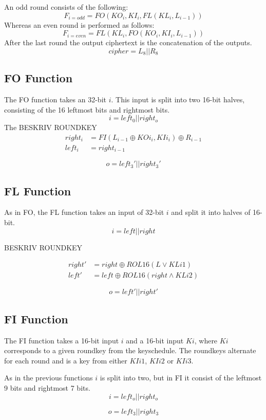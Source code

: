 An odd round consists of the following:
\[F_{i = odd} = FO(KO_i, KI_i, FL(KL_i, L_{i - 1})) \]
Whereas an even round is performed as follows: 
\[F_{i = even} = FL(KL_i, FO(KO_i,KI_i, L_{i - 1})) \]
After the last round the output ciphertext is the concatenation of the
outputs.
\[cipher = L_8 || R_8\]

\subsection{FO Function}
The FO function takes an 32-bit $i$. This input is split into two
16-bit halves, consisting of the 16 leftmost bits and rightmost bits.
\[i = left_0 || right_o\]
The 
BESKRIV ROUNDKEY
\begin{align*}
  right_i &= FI(L_{i-1} \oplus KOi_i, KIi_i) \oplus R_{i - 1}\\
  left_i &= right_{i - 1}
\end{align*}

\[o = left_3' || right_3'\]
\subsection{FL Function}
As in FO, the FL function takes an input of 32-bit $i$ and split it into
halves of 16-bit.
\[i = left || right\]

BESKRIV ROUNDKEY

\begin{align*}
  right' &= right \oplus ROL16(L \lor KLi1)\\
  left' &= left \oplus ROL16(right \land KLi2)
\end{align*}

\[o = left' || right'\]
\subsection{FI Function}
The FI function takes a 16-bit input $i$ and a 16-bit input $Ki$,
where $Ki$ corresponds to a given roundkey from the keyschedule. The
roundkeys alternate for each round and is a key from either $KIi1$, $KIi2$
or $KIi3$.

As in the previous functions $i$ is split into two, but in FI it
consist of the leftmost 9 bits and rightmost 7 bits.
\[ i = left_o || right_o \]


\[o = left_3 || right_3\]

